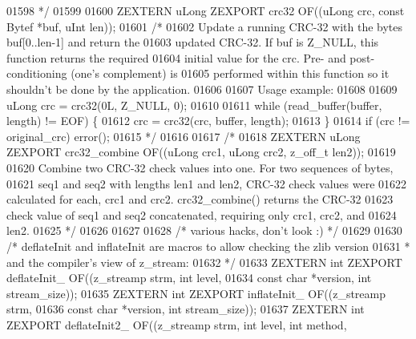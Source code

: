 \begin{DoxyCode}
01598 \textcolor{comment}{*/}
01599 
01600 ZEXTERN uLong ZEXPORT crc32   OF((uLong crc, \textcolor{keyword}{const} Bytef *buf, uInt len));
01601 \textcolor{comment}{/*}
01602 \textcolor{comment}{     Update a running CRC-32 with the bytes buf[0..len-1] and return the}
01603 \textcolor{comment}{   updated CRC-32.  If buf is Z\_NULL, this function returns the required}
01604 \textcolor{comment}{   initial value for the crc.  Pre- and post-conditioning (one's complement) is}
01605 \textcolor{comment}{   performed within this function so it shouldn't be done by the application.}
01606 \textcolor{comment}{}
01607 \textcolor{comment}{   Usage example:}
01608 \textcolor{comment}{}
01609 \textcolor{comment}{     uLong crc = crc32(0L, Z\_NULL, 0);}
01610 \textcolor{comment}{}
01611 \textcolor{comment}{     while (read\_buffer(buffer, length) != EOF) \{}
01612 \textcolor{comment}{       crc = crc32(crc, buffer, length);}
01613 \textcolor{comment}{     \}}
01614 \textcolor{comment}{     if (crc != original\_crc) error();}
01615 \textcolor{comment}{*/}
01616 
01617 \textcolor{comment}{/*}
01618 \textcolor{comment}{ZEXTERN uLong ZEXPORT crc32\_combine OF((uLong crc1, uLong crc2, z\_off\_t len2));}
01619 \textcolor{comment}{}
01620 \textcolor{comment}{     Combine two CRC-32 check values into one.  For two sequences of bytes,}
01621 \textcolor{comment}{   seq1 and seq2 with lengths len1 and len2, CRC-32 check values were}
01622 \textcolor{comment}{   calculated for each, crc1 and crc2.  crc32\_combine() returns the CRC-32}
01623 \textcolor{comment}{   check value of seq1 and seq2 concatenated, requiring only crc1, crc2, and}
01624 \textcolor{comment}{   len2.}
01625 \textcolor{comment}{*/}
01626 
01627 
01628                         \textcolor{comment}{/* various hacks, don't look :) */}
01629 
01630 \textcolor{comment}{/* deflateInit and inflateInit are macros to allow checking the zlib version}
01631 \textcolor{comment}{ * and the compiler's view of z\_stream:}
01632 \textcolor{comment}{ */}
01633 ZEXTERN \textcolor{keywordtype}{int} ZEXPORT deflateInit\_ OF((z\_streamp strm, \textcolor{keywordtype}{int} level,
01634                                      \textcolor{keyword}{const} \textcolor{keywordtype}{char} *version, \textcolor{keywordtype}{int} stream\_size));
01635 ZEXTERN \textcolor{keywordtype}{int} ZEXPORT inflateInit\_ OF((z\_streamp strm,
01636                                      \textcolor{keyword}{const} \textcolor{keywordtype}{char} *version, \textcolor{keywordtype}{int} stream\_size));
01637 ZEXTERN \textcolor{keywordtype}{int} ZEXPORT deflateInit2\_ OF((z\_streamp strm, \textcolor{keywordtype}{int}  level, \textcolor{keywordtype}{int}  method,

\end{DoxyCode}
